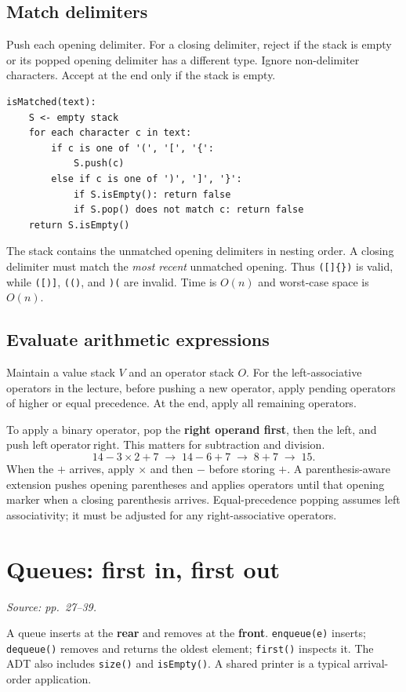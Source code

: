 \documentclass[11pt]{article}
\begin{document}
\subsection{Match delimiters}
Push each opening delimiter. For a closing delimiter, reject if the stack is empty or its popped opening delimiter has a different type. Ignore non-delimiter characters. Accept at the end only if the stack is empty.
\begin{lstlisting}
isMatched(text):
    S <- empty stack
    for each character c in text:
        if c is one of '(', '[', '{':
            S.push(c)
        else if c is one of ')', ']', '}':
            if S.isEmpty(): return false
            if S.pop() does not match c: return false
    return S.isEmpty()
\end{lstlisting}
The stack contains the unmatched opening delimiters in nesting order. A closing delimiter must match the \emph{most recent} unmatched opening. Thus \texttt{([]\{\})} is valid, while \texttt{([)]}, \texttt{(()}, and \texttt{)(} are invalid. Time is $O(n)$ and worst-case space is $O(n)$.

\subsection{Evaluate arithmetic expressions}
Maintain a value stack $V$ and an operator stack $O$. For the left-associative operators in the lecture, before pushing a new operator, apply pending operators of higher or equal precedence. At the end, apply all remaining operators.

To apply a binary operator, pop the \textbf{right operand first}, then the left, and push $\text{left}\ \text{operator}\ \text{right}$. This matters for subtraction and division.
\[
14-3\times2+7\;\longrightarrow\;14-6+7
\;\longrightarrow\;8+7\;\longrightarrow\;15.
\]
When the $+$ arrives, apply $\times$ and then $-$ before storing $+$. A parenthesis-aware extension pushes opening parentheses and applies operators until that opening marker when a closing parenthesis arrives. Equal-precedence popping assumes left associativity; it must be adjusted for any right-associative operators.

\section{Queues: first in, first out}
\textit{Source: pp.\ 27--39.}

A queue inserts at the \textbf{rear} and removes at the \textbf{front}. \texttt{enqueue(e)} inserts; \texttt{dequeue()} removes and returns the oldest element; \texttt{first()} inspects it. The ADT also includes \texttt{size()} and \texttt{isEmpty()}. A shared printer is a typical arrival-order application.
\end{document}
